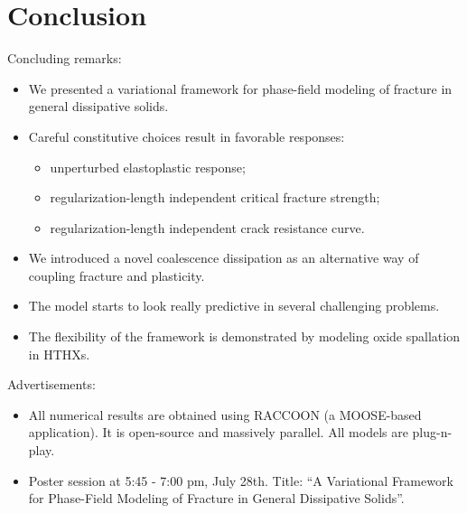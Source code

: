 \section{Conclusion}

\begin{frame}
  \vspace{-1em}
  Concluding remarks:
  \begin{itemize}
    \item We presented a variational framework for phase-field modeling of fracture in general dissipative solids.
    \item Careful constitutive choices result in favorable responses:
          \begin{itemize}
            \item unperturbed elastoplastic response;
            \item regularization-length independent critical fracture strength;
            \item regularization-length independent crack resistance curve.
          \end{itemize}
    \item We introduced a novel coalescence dissipation as an alternative way of coupling fracture and plasticity.
    \item The model starts to look really predictive in several challenging problems.
    \item The flexibility of the framework is demonstrated by modeling oxide spallation in HTHXs.
  \end{itemize}
  
  \bigskip
  
  Advertisements:
  \begin{itemize}
    \item All numerical results are obtained using RACCOON (a MOOSE-based application). It is open-source and massively parallel. All models are plug-n-play.
    \item Poster session at 5:45 - 7:00 pm, July 28th. Title: ``A Variational Framework for Phase-Field Modeling of Fracture in General Dissipative Solids''.
  \end{itemize}
  
  \bigskip
  

\end{frame}

